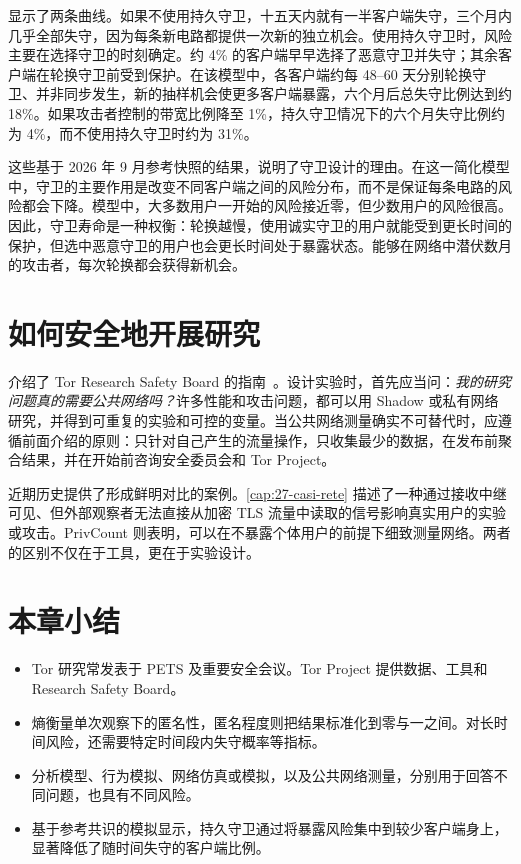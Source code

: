  显示了两条曲线。如果不使用持久守卫，十五天内就有一半客户端失守，三个月内几乎全部失守，因为每条新电路都提供一次新的独立机会。使用持久守卫时，风险主要在选择守卫的时刻确定。约 4\% 的客户端早早选择了恶意守卫并失守；其余客户端在轮换守卫前受到保护。在该模型中，各客户端约每 48--60 天分别轮换守卫、并非同步发生，新的抽样机会使更多客户端暴露，六个月后总失守比例达到约 18\%。如果攻击者控制的带宽比例降至 1\%，持久守卫情况下的六个月失守比例约为 4\%，而不使用持久守卫时约为 31\%。

这些基于 2026 年 9 月参考快照的结果，说明了守卫设计的理由。在这一简化模型中，守卫的主要作用是改变不同客户端之间的风险分布，而不是保证每条电路的风险都会下降。模型中，大多数用户一开始的风险接近零，但少数用户的风险很高。因此，守卫寿命是一种权衡：轮换越慢，使用诚实守卫的用户就能受到更长时间的保护，但选中恶意守卫的用户也会更长时间处于暴露状态。能够在网络中潜伏数月的攻击者，每次轮换都会获得新机会。

\section{如何安全地开展研究}\label{sec:ric-sicurezza}

 介绍了 Tor Research Safety Board 的指南~\cite{trsb}。设计实验时，首先应当问：\emph{我的研究问题真的需要公共网络吗？}许多性能和攻击问题，都可以用 Shadow 或私有网络研究，并得到可重复的实验和可控的变量。当公共网络测量确实不可替代时，应遵循前面介绍的原则：只针对自己产生的流量操作，只收集最少的数据，在发布前聚合结果，并在开始前咨询安全委员会和 Tor Project。

近期历史提供了形成鲜明对比的案例。\cref{cap:27-casi-rete} 描述了一种通过接收中继可见、但外部观察者无法直接从加密 TLS 流量中读取的信号影响真实用户的实验或攻击。PrivCount 则表明，可以在不暴露个体用户的前提下细致测量网络。两者的区别不仅在于工具，更在于实验设计。

\section*{本章小结}
\begin{itemize}
  \item Tor 研究常发表于 PETS 及重要安全会议。Tor Project 提供数据、工具和 Research Safety Board。
  \item 熵衡量单次观察下的匿名性，匿名程度则把结果标准化到零与一之间。对长时间风险，还需要特定时间段内失守概率等指标。
  \item 分析模型、行为模拟、网络仿真或模拟，以及公共网络测量，分别用于回答不同问题，也具有不同风险。
  \item 基于参考共识的模拟显示，持久守卫通过将暴露风险集中到较少客户端身上，显著降低了随时间失守的客户端比例。
\end{itemize}

